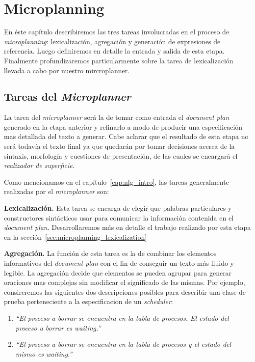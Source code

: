\chapter{Microplanning}
\label{cap:microplanning}

En éste capítulo describiremos las tres tareas involucradas en el proceso de \textit{microplanning}: lexicalización, agregación y generación de expresiones de referencia. Luego definiremos en detalle la entrada y salida de esta etapa. Finalmente profundizaremos particularmente sobre la tarea de lexicalización llevada a cabo por nuestro mircroplanner. 
\section{Tareas del \textit{Microplanner}}

La tarea del \textit{microplanner} será la de tomar como entrada el \textit{document plan} generado en la etapa anterior y refinarlo a modo de producir una especificación mas detallada del texto a generar. Cabe aclarar que el resultado de esta etapa no será todavía el texto final ya que quedarán por tomar decisiones acerca de la sintaxis, morfología y cuestiones de presentación, de las cuales se encargará el \emph{realizador de superficie}.

Como mencionamos en el capítulo~\ref{cap:nlg_intro}, las tareas generalmente realizadas por el \emph{microplanner} son:

\medskip
\noindent
\textbf{Lexicalización.} Esta tarea se encarga de elegir que palabras particulares y constructores sintácticos usar para comunicar la información contenida en el \textit{document plan}. Desarrollaremos más en detalle el trabajo realizado por esta etapa en la sección~\ref{sec:microplanning_lexicalization}


\medskip
\noindent
\textbf{Agregación.} La función de esta tarea es la de combinar los elementos informativos del \emph{document plan} con el fin de conseguir un texto más fluido y legible. La agregación decide que elementos se pueden agrupar para generar oraciones mas complejas sin modificar el significado de las mismas. Por ejemplo, consireremos las siguientes dos descripciones posibles para describir una clase de prueba perteneciente a la especificacion de un \emph{scheduler}:

\begin{center}
\begin{enumerate}
  \item \emph{``El proceso a borrar se encuentra en la tabla de procesos. El estado del proceso a borrar es waiting.''} 
  \item \emph{``El proceso a borrar se encuentra en la tabla de procesos y el estado del mismo es waiting.''}
\end{enumerate}
\end{center}

